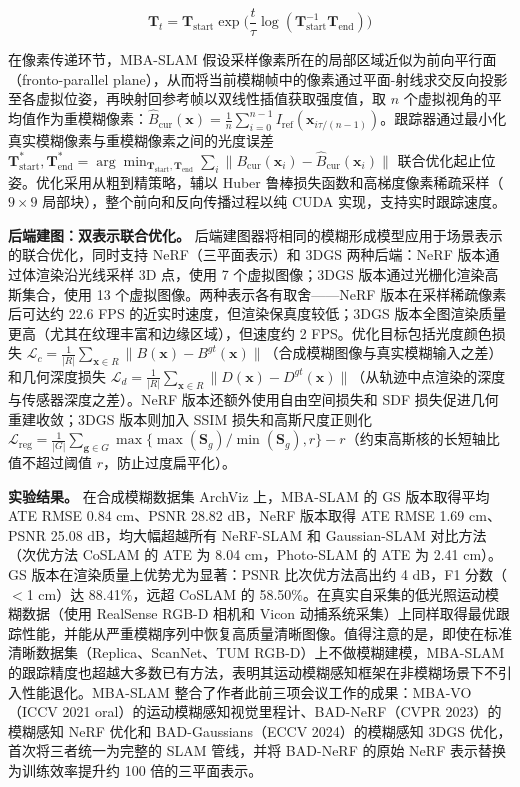 \begin{equation}
    \mathbf{T}_t = \mathbf{T}_{\mathrm{start}} \exp\!\Big(\frac{t}{\tau} \log(\mathbf{T}_{\mathrm{start}}^{-1} \mathbf{T}_{\mathrm{end}})\Big)
    \label{eq:ch15_se3_interp}
\end{equation}

在像素传递环节，MBA-SLAM 假设采样像素所在的局部区域近似为前向平行面（fronto-parallel plane），从而将当前模糊帧中的像素通过平面-射线求交反向投影至各虚拟位姿，再映射回参考帧以双线性插值获取强度值，取 $n$ 个虚拟视角的平均值作为重模糊像素：$\hat{B}_{\mathrm{cur}}(\mathbf{x}) = \frac{1}{n}\sum_{i=0}^{n-1} I_{\mathrm{ref}}(\mathbf{x}_{i\tau/(n-1)})$。跟踪器通过最小化真实模糊像素与重模糊像素之间的光度误差 $\mathbf{T}_{\mathrm{start}}^*, \mathbf{T}_{\mathrm{end}}^* = \arg\min_{\mathbf{T}_{\mathrm{start}}, \mathbf{T}_{\mathrm{end}}} \sum_{i}\|B_{\mathrm{cur}}(\mathbf{x}_i) - \hat{B}_{\mathrm{cur}}(\mathbf{x}_i)\|$ 联合优化起止位姿。优化采用从粗到精策略，辅以 Huber 鲁棒损失函数和高梯度像素稀疏采样（$9 \times 9$ 局部块），整个前向和反向传播过程以纯 CUDA 实现，支持实时跟踪速度。

\textbf{后端建图：双表示联合优化。}
后端建图器将相同的模糊形成模型应用于场景表示的联合优化，同时支持 NeRF（三平面表示）和 3DGS 两种后端：NeRF 版本通过体渲染沿光线采样 3D 点，使用 7 个虚拟图像；3DGS 版本通过光栅化渲染高斯集合，使用 13 个虚拟图像。两种表示各有取舍——NeRF 版本在采样稀疏像素后可达约 22.6 FPS 的近实时速度，但渲染保真度较低；3DGS 版本全图渲染质量更高（尤其在纹理丰富和边缘区域），但速度约 2 FPS。优化目标包括光度颜色损失 $\mathcal{L}_c = \frac{1}{|R|}\sum_{\mathbf{x} \in R}\|B(\mathbf{x}) - B^{gt}(\mathbf{x})\|$（合成模糊图像与真实模糊输入之差）和几何深度损失 $\mathcal{L}_d = \frac{1}{|R|}\sum_{\mathbf{x} \in R}\|D(\mathbf{x}) - D^{gt}(\mathbf{x})\|$（从轨迹中点渲染的深度与传感器深度之差）。NeRF 版本还额外使用自由空间损失和 SDF 损失促进几何重建收敛；3DGS 版本则加入 SSIM 损失和高斯尺度正则化 $\mathcal{L}_{\mathrm{reg}} = \frac{1}{|G|}\sum_{\mathbf{g} \in G}\max\{\max(\mathbf{S}_g)/\min(\mathbf{S}_g), r\} - r$（约束高斯核的长短轴比值不超过阈值 $r$，防止过度扁平化）。

\textbf{实验结果。}
在合成模糊数据集 ArchViz 上，MBA-SLAM 的 GS 版本取得平均 ATE RMSE 0.84 cm、PSNR 28.82 dB，NeRF 版本取得 ATE RMSE 1.69 cm、PSNR 25.08 dB，均大幅超越所有 NeRF-SLAM 和 Gaussian-SLAM 对比方法（次优方法 CoSLAM 的 ATE 为 8.04 cm，Photo-SLAM 的 ATE 为 2.41 cm）。GS 版本在渲染质量上优势尤为显著：PSNR 比次优方法高出约 4 dB，F1 分数（$<$1 cm）达 88.41\%，远超 CoSLAM 的 58.50\%。在真实自采集的低光照运动模糊数据（使用 RealSense RGB-D 相机和 Vicon 动捕系统采集）上同样取得最优跟踪性能，并能从严重模糊序列中恢复高质量清晰图像。值得注意的是，即使在标准清晰数据集（Replica、ScanNet、TUM RGB-D）上不做模糊建模，MBA-SLAM 的跟踪精度也超越大多数已有方法，表明其运动模糊感知框架在非模糊场景下不引入性能退化。MBA-SLAM 整合了作者此前三项会议工作的成果：MBA-VO（ICCV 2021 oral）的运动模糊感知视觉里程计、BAD-NeRF（CVPR 2023）的模糊感知 NeRF 优化和 BAD-Gaussians（ECCV 2024）的模糊感知 3DGS 优化，首次将三者统一为完整的 SLAM 管线，并将 BAD-NeRF 的原始 NeRF 表示替换为训练效率提升约 100 倍的三平面表示。


